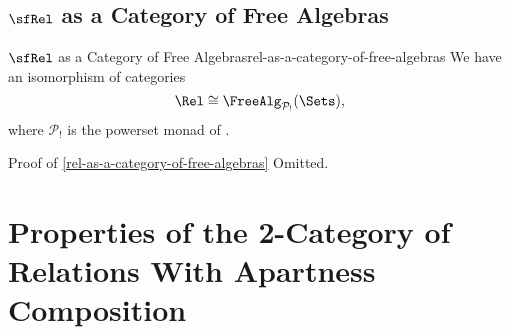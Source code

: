 \subsection{$\sfRel$ as a Category of Free Algebras}\label{subsection-rel-as-a-category-of-free-algebras}
\begin{proposition}{$\sfRel$ as a Category of Free Algebras}{rel-as-a-category-of-free-algebras}%
    We have an isomorphism of categories
    \[
        \Rel%
        \cong%
        \FreeAlg_{\mathcal{P}_{!}}(\Sets),
    \]%
    where $\mathcal{P}_{!}$ is the powerset monad of .
\end{proposition}
\begin{Proof}{Proof of \cref{rel-as-a-category-of-free-algebras}}%
    Omitted.
\end{Proof}
\section{Properties of the 2-Category of Relations With Apartness Composition}\label{section-properties-of-the-2-category-of-relations-with-apartness-composition}

